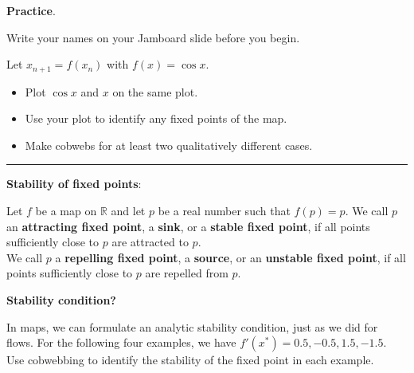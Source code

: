 \documentclass[12pt,letterpaper,noanswers]{exam}
\begin{document}
\vspace{2in}

\noindent\textbf{Practice}.


Write your names on your Jamboard slide before you begin.


Let $x_{n+1} = f(x_n)$ with $f(x) = \cos x$.
\begin{itemize}
\itemsep0em
    \item Plot $\cos x$ and $x$ on the same plot.
    \item Use your plot to identify any fixed points of the map.
    \item Make cobwebs for at least two qualitatively different cases.
\end{itemize}

\eject

\vspace{0.2cm}
\hrule
\vspace{0.2cm}

\noindent\textbf{Stability of fixed points}:

\begin{tcolorbox}
Let $f$ be a map on $\mathbb{R}$ and let $p$ be a real number such that $f(p) = p$.  We call $p$ an \textbf{attracting fixed point}, a \textbf{sink}, or a \textbf{stable fixed point}, if all points sufficiently close to $p$ are attracted to $p$. \\

We call $p$ a \textbf{repelling fixed point}, a \textbf{source}, or an \textbf{unstable fixed point}, if all points sufficiently close to $p$ are repelled from $p$. 
\end{tcolorbox}

\noindent\textbf{Stability condition?}

In maps, we can formulate an analytic stability condition, just as we did for flows.  For the following four examples, we have $f'(x^*) = 0.5, -0.5, 1.5, -1.5$.  Use cobwebbing to identify the stability of the fixed point in each example.
\end{document}
